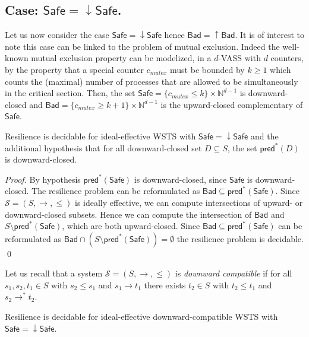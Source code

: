 \documentclass[runningheads]{llncs}
\newcommand{\pred}{\textsf{pred}}
\newcommand{\Bad}{\textsf{Bad}}
\newcommand{\Safe}{\textsf{Safe}}
\begin{document}
\subsection{Case: $\Safe=\downarrow \Safe$.}\label{safe-down}


Let us now consider the case $\Safe=\downarrow \Safe$ hence $\Bad=\uparrow \Bad$.
It is of interest to note this case can be linked to the problem of mutual exclusion.
Indeed the well-known mutual exclusion property can be modelized, in a $d$-VASS with $d$ counters, by the property that a special counter $c_{mutex}$ must be bounded by $k \geq 1$ which counts the (maximal) number of processes that are allowed to be simultaneously in the critical section. Then, the set $\Safe =  \{c_{mutex} \leq k\} \times \mathbb{N}^{d-1}$ is downward-closed		and $\Bad =\{c_{mutex} \geq k+1\} \times  \mathbb{N}^{d-1} $ is the upward-closed complementary of $\Safe$. 


%
\begin{theorem}\label{up-down}
{\sc Resilience}  is decidable for ideal-effective WSTS with 
$\Safe=\downarrow \Safe$
and
the additional hypothesis that
for all downward-closed set $D \subseteq S$, the set $\pred^*(D)$ is downward-closed.
\end{theorem}

\begin{proof}
By hypothesis $\pred^*(\Safe)$ is downward-closed, since $\Safe$ is downward-closed.
The resilience problem can be reformulated as 
$\Bad \subseteq  \pred^*(\Safe)$.
Since $\mathscr{S}=(S,\rightarrow, \leq)$ is ideally effective, we can compute intersections of upward- or downward-closed 
 subsets.
Hence we can compute the intersection of
$\Bad$
and
$S \setminus \pred^*(\Safe)$,
which are both upward-closed.
Since
$\Bad \subseteq \pred^*(\Safe)$
can be reformulated as
$\Bad \cap (S \setminus \pred^*(\Safe)) = \emptyset$
the resilience problem is decidable. \qed
\end{proof}

Let us recall that a system $\mathscr{S}=(S,\rightarrow, \leq)$ is \emph{downward compatible} \cite{DBLP:journals/tcs/FinkelS01} if
for all $s_1, s_2, t_1 \in S$ with
$s_2 \leq s_1$ and $s_1 \to t_1$
there
exists $t_2 \in S$ with
$t_2 \leq t_1$ and $s_2 \to^* t_2$.

\begin{corollary}
{\sc Resilience} is decidable for ideal-effective downward-compatible WSTS with 
$\Safe=\downarrow \Safe$.
\end{corollary}
\end{document}
